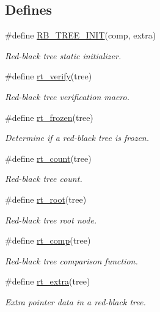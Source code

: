 \subsection*{Defines}
\begin{CompactItemize}
\item 
\#define \hyperlink{group__dbprim__rbtree_a14}{RB\_\-TREE\_\-INIT}(comp, extra)
\begin{CompactList}\small\item\em Red-black tree static initializer. \item\end{CompactList}\item 
\#define \hyperlink{group__dbprim__rbtree_a15}{rt\_\-verify}(tree)
\begin{CompactList}\small\item\em Red-black tree verification macro. \item\end{CompactList}\item 
\#define \hyperlink{group__dbprim__rbtree_a16}{rt\_\-frozen}(tree)
\begin{CompactList}\small\item\em Determine if a red-black tree is frozen. \item\end{CompactList}\item 
\#define \hyperlink{group__dbprim__rbtree_a17}{rt\_\-count}(tree)
\begin{CompactList}\small\item\em Red-black tree count. \item\end{CompactList}\item 
\#define \hyperlink{group__dbprim__rbtree_a18}{rt\_\-root}(tree)
\begin{CompactList}\small\item\em Red-black tree root node. \item\end{CompactList}\item 
\#define \hyperlink{group__dbprim__rbtree_a19}{rt\_\-comp}(tree)
\begin{CompactList}\small\item\em Red-black tree comparison function. \item\end{CompactList}\item 
\#define \hyperlink{group__dbprim__rbtree_a20}{rt\_\-extra}(tree)
\begin{CompactList}\small\item\em Extra pointer data in a red-black tree. \item\end{CompactList}\item 

\end{CompactItemize}
